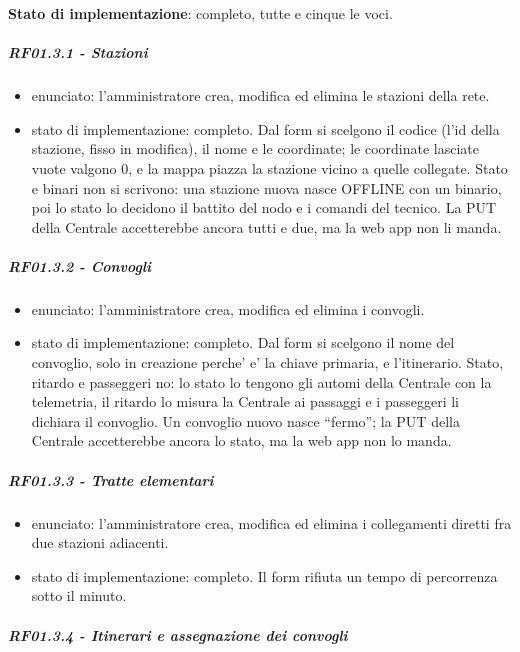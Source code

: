 \documentclass[11pt]{article}
\begin{document}
\textbf{Stato di implementazione}: completo, tutte e cinque le voci.
\subparagraph{RF01.3.1 - Stazioni}
\label{sec:orgf88d7c6}
\begin{itemize}
\item enunciato: l'amministratore crea, modifica ed elimina le stazioni della rete.
\item stato di implementazione: completo. Dal form si scelgono il codice (l'id della stazione, fisso in
modifica), il nome e le coordinate; le coordinate lasciate vuote valgono 0, e la mappa piazza la
stazione vicino a quelle collegate. Stato e binari non si scrivono: una stazione nuova nasce
OFFLINE con un binario, poi lo stato lo decidono il battito del nodo e i comandi del tecnico. La
PUT della Centrale accetterebbe ancora tutti e due, ma la web app non li manda.
\end{itemize}
\subparagraph{RF01.3.2 - Convogli}
\label{sec:org10496cd}
\begin{itemize}
\item enunciato: l'amministratore crea, modifica ed elimina i convogli.
\item stato di implementazione: completo. Dal form si scelgono il nome del convoglio, solo in
creazione perche' e' la chiave primaria, e l'itinerario. Stato, ritardo e passeggeri no: lo stato
lo tengono gli automi della Centrale con la telemetria, il ritardo lo misura la Centrale ai
passaggi e i passeggeri li dichiara il convoglio. Un convoglio nuovo nasce ``fermo''; la PUT della
Centrale accetterebbe ancora lo stato, ma la web app non lo manda.
\end{itemize}
\subparagraph{RF01.3.3 - Tratte elementari}
\label{sec:org9f380bc}
\begin{itemize}
\item enunciato: l'amministratore crea, modifica ed elimina i collegamenti diretti fra due stazioni
adiacenti.
\item stato di implementazione: completo. Il form rifiuta un tempo di percorrenza sotto il minuto.
\end{itemize}
\subparagraph{RF01.3.4 - Itinerari e assegnazione dei convogli}
\label{sec:org7afcd8e}
\end{document}
